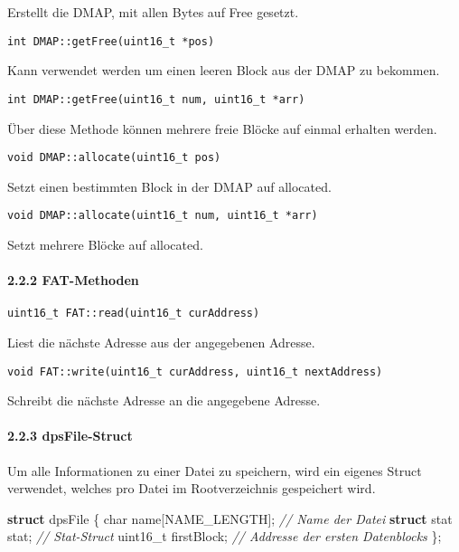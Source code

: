 \documentclass[]{article}
\newenvironment{Shaded}{}{}
\newcommand{\CommentTok}[1]{\textcolor[rgb]{0.38,0.63,0.69}{\textit{#1}}}
\newcommand{\DataTypeTok}[1]{\textcolor[rgb]{0.56,0.13,0.00}{#1}}
\newcommand{\KeywordTok}[1]{\textcolor[rgb]{0.00,0.44,0.13}{\textbf{#1}}}
\newcommand{\NormalTok}[1]{#1}
\let\oldparagraph\paragraph
\renewcommand{\paragraph}[1]{\oldparagraph{#1}\mbox{}}
\begin{document}
Erstellt die DMAP, mit allen Bytes auf Free gesetzt.

\texttt{int\ DMAP::getFree(uint16\_t\ *pos)}

Kann verwendet werden um einen leeren Block aus der DMAP zu bekommen.

\texttt{int\ DMAP::getFree(uint16\_t\ num,\ uint16\_t\ *arr)}

Über diese Methode können mehrere freie Blöcke auf einmal erhalten
werden.

\texttt{void\ DMAP::allocate(uint16\_t\ pos)}

Setzt einen bestimmten Block in der DMAP auf allocated.

\texttt{void\ DMAP::allocate(uint16\_t\ num,\ uint16\_t\ *arr)}

Setzt mehrere Blöcke auf allocated.

\hypertarget{fat-methoden}{%
\paragraph{2.2.2 FAT-Methoden}\label{fat-methoden}}

\texttt{uint16\_t\ FAT::read(uint16\_t\ curAddress)}

Liest die nächste Adresse aus der angegebenen Adresse.

\texttt{void\ FAT::write(uint16\_t\ curAddress,\ uint16\_t\ nextAddress)}

Schreibt die nächste Adresse an die angegebene Adresse.

\hypertarget{dpsfile-struct}{%
\paragraph{2.2.3 dpsFile-Struct}\label{dpsfile-struct}}

Um alle Informationen zu einer Datei zu speichern, wird ein eigenes
Struct verwendet, welches pro Datei im Rootverzeichnis gespeichert wird.

\begin{Shaded}
  \begin{framed}
\begin{Highlighting}[]
\KeywordTok{struct}\NormalTok{ dpsFile \{}
    \DataTypeTok{char}\NormalTok{ name[NAME_LENGTH]; }\CommentTok{// Name der Datei}
    \KeywordTok{struct}\NormalTok{ stat stat;       }\CommentTok{// Stat-Struct}
    \DataTypeTok{uint16_t}\NormalTok{ firstBlock;    }\CommentTok{// Addresse der ersten Datenblocks}
\NormalTok{\};}
\end{Highlighting}
\end{framed}
\end{Shaded}
\end{document}
